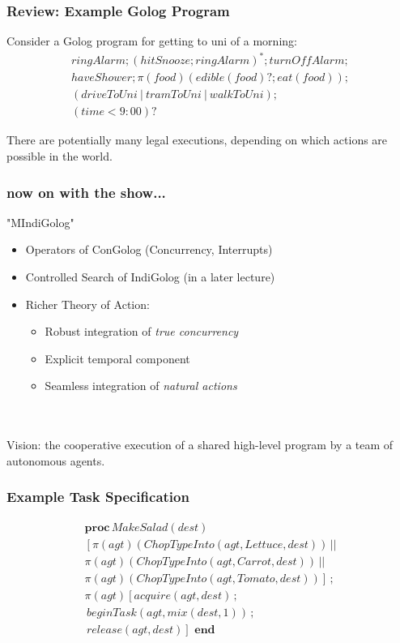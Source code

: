 \documentclass[compress]{beamer}
\begin{document}
\begin{frame}
\frametitle{Review: Example Golog Program}
Consider a Golog program for getting to uni of a morning:\[
\begin{array}{c}
ringAlarm;(hitSnooze; ringAlarm)^*;turnOffAlarm;\\
haveShower;\pi(food)(edible(food)?;eat(food));\\
(driveToUni\ |\ tramToUni\ |\ walkToUni);\\
(time<9:00)?
\end{array}\]

There are potentially many legal executions, depending on which actions
are possible in the world.
\end{frame}


\begin{frame}
\frametitle{now on with the show...}
\centering "MIndiGolog"\\
\begin{itemize}
\item Operators of ConGolog (Concurrency, Interrupts)
\item Controlled Search of IndiGolog (in a later lecture)
\item Richer Theory of Action:
\begin{itemize}
\item Robust integration of \emph{true concurrency}
\item Explicit temporal component
\item Seamless integration of \emph{natural actions}
\end{itemize}
\end{itemize}
\ \\
\ \\
Vision: the cooperative execution of a shared high-level program by a team of autonomous agents.
\end{frame}

\begin{frame}
\frametitle{Example Task Specification}
\begin{multline*}
\mathbf{proc}\, MakeSalad(dest)\\
\left[\pi(agt)(ChopTypeInto(agt,Lettuce,dest))\,||\right.\\
\pi(agt)(ChopTypeInto(agt,Carrot,dest))\,||\\
\left.\pi(agt)(ChopTypeInto(agt,Tomato,dest))\right]\,;\\
\pi(agt)\left[acquire(agt,dest)\,;\right.\\
\,beginTask(agt,mix(dest,1))\,;\\
\left.\, release(agt,dest)\right]\,\,\mathbf{end}
\end{multline*}
\end{frame}
\end{document}
